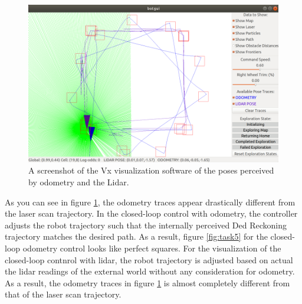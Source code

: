 \documentclass[conference]{IEEEtran}
\begin{document}
\begin{figure}
	\includegraphics[width=\linewidth]{task6_2.png}
	\caption{A screenshot of the Vx visualization software of the poses perceived by odometry and the Lidar.}
	\label{fig:task6_2}
\end{figure}

As you can see in figure \ref{fig:task6_2}, the odometry traces appear drastically different from the laser scan trajectory. In the closed-loop control with odometry,
the controller adjusts the robot trajectory such that the internally perceived Ded Reckoning trajectory matches the desired path. As a result, figure \ref{fig:task5}
for the closed-loop odometry control looks like perfect squares. For the visualization of the closed-loop contnrol with lidar, the robot trajectory is adjusted based on
actual the lidar readings of the external world without any consideration for odometry. As a result, the odometry traces in figure \ref{fig:task6_2} is almost completely
different from that of the laser scan trajectory.
\end{document}
